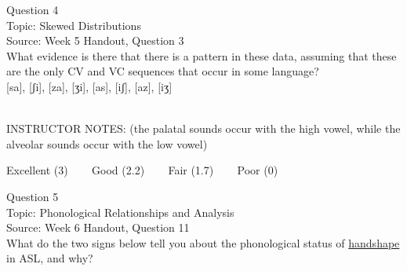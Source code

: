 \documentclass[12pt]{article}
\begin{document}
{\large Question 4}\\

Topic: Skewed Distributions\\
Source: Week 5 Handout, Question 3\\

What evidence is there that there is a pattern in these data, assuming that these are the only CV and VC sequences that occur in some language?\\

{[sa]}, {[ʃi]}, {[za]}, {[ʒi]}, {[as]}, {[iʃ]}, {[az]}, {[iʒ]}


~\\
INSTRUCTOR NOTES: (the palatal sounds occur with the high vowel, while the alveolar sounds occur with the low vowel)


\vfill
Excellent (3) ~~~ Good (2.2) ~~~ Fair (1.7) ~~~ Poor (0)
\newpage

{\large Question 5}\\

Topic: Phonological Relationships and Analysis\\
Source: Week 6 Handout, Question 11\\

What do the two signs below tell you about the phonological status of \underline{handshape} in ASL, and why?\\
\end{document}
